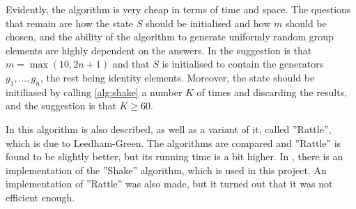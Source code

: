 Evidently, the algorithm is very cheap in terms of time and space. The
questions that remain are how the state $S$ should be initialised and
how $m$ should be chosen, and the ability of the algorithm to generate
uniformly random group elements are highly dependent on the answers.
In \cite{lg95} the suggestion is that $m = \max (10, 2n + 1)$ and that
$S$ is initialised to contain the generators $g_1, \dotsc, g_n$, the
rest being identity elements. Moreover, the state should be
initiliased by calling \ref{alg:shake} a number $K$ of times and
discarding the results, and the suggestion is that $K \geq 60$.

In \cite{niemeyer01} this algorithm is also described, as well as a
variant of it, called ''Rattle'', which is due to Leedham-Green. The
algorithms are compared and ''Rattle'' is found to be slightly better,
but its running time is a bit higher. In \GAP, there is an
implementation of the ''Shake'' algorithm, which is used in this
project. An implementation of ''Rattle'' was also made, but it turned
out that it was not efficient enough.

